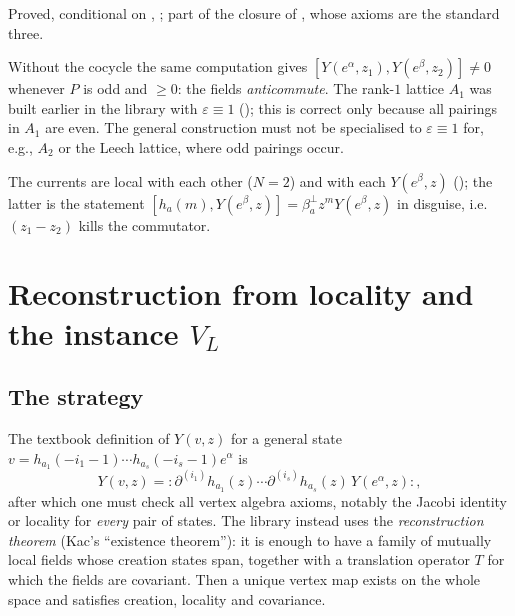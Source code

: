 \begin{status}
Proved, conditional on , ; part of the closure of
, whose axioms are the standard three.
\end{status}

\begin{warning}
Without the cocycle the same computation gives $[Y(e^\alpha,z_1),Y(e^\beta,z_2)]\ne0$ whenever
$P$ is odd and $\geq 0$: the fields \emph{anticommute}. The rank-$1$ lattice $A_1$ was built
earlier in the library with $\varepsilon\equiv1$ (); this is
correct only because all pairings in $A_1$ are even. The general construction must not be
specialised to $\varepsilon\equiv 1$ for, e.g., $A_2$ or the Leech lattice, where odd pairings
occur.
\end{warning}

The currents are local with each other ($N=2$) and with each $Y(e^\beta,z)$
(); the latter is the statement
$[h_a(m),Y(e^\beta,z)]=\beta^\perp_az^mY(e^\beta,z)$ in disguise, i.e.\ $(z_1-z_2)$ kills the
commutator.

\section{Reconstruction from locality and the instance \texorpdfstring{$V_L$}{V\_L}}\label{ch03:sec:reconstruction}

\subsection{The strategy}

The textbook definition of $Y(v,z)$ for a general state $v=h_{a_1}(-i_1-1)\cdots
h_{a_s}(-i_s-1)e^\alpha$ is
\begin{equation}\label{ch03:eq:Ygeneral}
  Y(v,z)={:}\partial^{(i_1)}h_{a_1}(z)\cdots\partial^{(i_s)}h_{a_s}(z)\,Y(e^\alpha,z){:},
\end{equation}
after which one must check all vertex algebra axioms, notably the Jacobi identity or locality for
\emph{every} pair of states. The library instead uses the \emph{reconstruction theorem} (Kac's
``existence theorem''): it is enough to have a family of mutually local fields whose creation
states span, together with a translation operator $T$ for which the fields are covariant. Then a
unique vertex map exists on the whole space and satisfies creation, locality and covariance.

